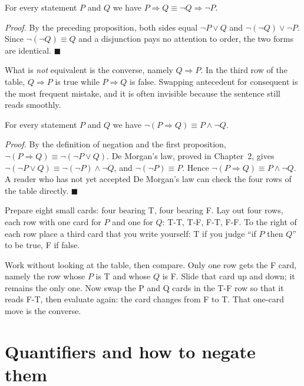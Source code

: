 \begin{akibat}[Contraposition]
For every statement $P$ and $Q$ we have
$P \Rightarrow Q \equiv \neg Q \Rightarrow \neg P$.
\end{akibat}
\par\smallskip\noindent\textit{Proof.} By the preceding proposition, both sides equal $\neg P \vee Q$ and
$\neg(\neg Q) \vee \neg P$. Since $\neg(\neg Q) \equiv Q$ and a disjunction pays no
attention to order, the two forms are identical.
\hfill$\blacksquare${\parfillskip=0pt\par}

What is \emph{not} equivalent is the converse, namely $Q \Rightarrow P$. In the third row of
the table, $Q \Rightarrow P$ is true while $P \Rightarrow Q$ is false. Swapping antecedent
for consequent is the most frequent mistake, and it is often invisible because the sentence
still reads smoothly.

\begin{proposisi}
For every statement $P$ and $Q$ we have
$\neg(P \Rightarrow Q) \equiv P \wedge \neg Q$.
\end{proposisi}
\par\smallskip\noindent\textit{Proof.} By the definition of negation and the first proposition,
$\neg(P \Rightarrow Q) \equiv \neg(\neg P \vee Q)$. De Morgan's law, proved in
Chapter~2, gives $\neg(\neg P \vee Q) \equiv \neg(\neg P) \wedge \neg Q$, and
$\neg(\neg P) \equiv P$. Hence $\neg(P \Rightarrow Q) \equiv P \wedge \neg Q$.
A reader who has not yet accepted De Morgan's law can check the four rows of the table
directly.
\hfill$\blacksquare${\parfillskip=0pt\par}

\begin{tangan}
Prepare eight small cards: four bearing T, four bearing F. Lay out four rows,
each row with one card for $P$ and one for $Q$: T-T, T-F, F-T, F-F. To the right of each
row place a third card that you write yourself: T if you judge ``if $P$ then $Q$'' to be
true, F if false.

Work without looking at the table, then compare. Only one row gets the F card, namely the
row whose $P$ is T and whose $Q$ is F. Slide that card up and down; it remains
the only one. Now swap the P and Q cards in the T-F row so that it reads F-T, then evaluate
again: the card changes from F to T. That one-card move is the converse.
\end{tangan}
\section{Quantifiers and how to negate them}

